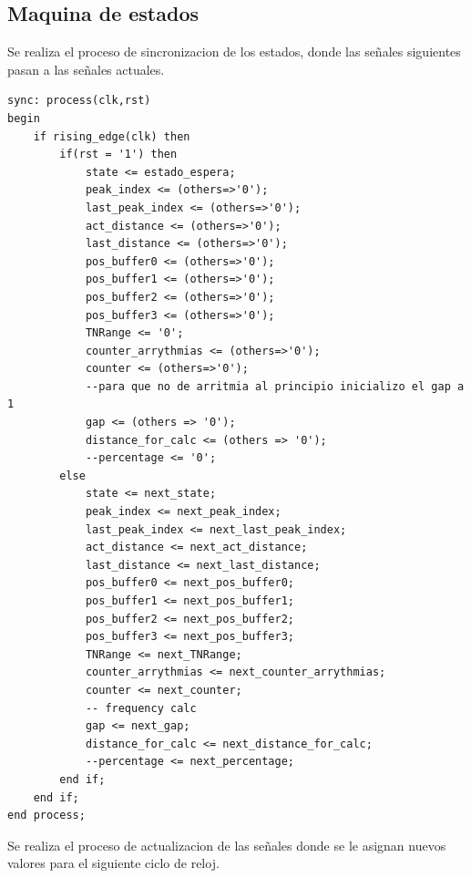 \subsection{Maquina de estados}
Se realiza el proceso de sincronizacion de los estados, donde las señales siguientes pasan a las señales actuales.

\lstset{language=VHDL, breaklines=true, basicstyle=\footnotesize}
\begin{lstlisting}[frame=single]
sync: process(clk,rst)
begin
    if rising_edge(clk) then
        if(rst = '1') then
            state <= estado_espera;
            peak_index <= (others=>'0');
            last_peak_index <= (others=>'0');
            act_distance <= (others=>'0');
            last_distance <= (others=>'0');
            pos_buffer0 <= (others=>'0');
            pos_buffer1 <= (others=>'0');
            pos_buffer2 <= (others=>'0');
            pos_buffer3 <= (others=>'0');
            TNRange <= '0';
            counter_arrythmias <= (others=>'0');
            counter <= (others=>'0');
            --para que no de arritmia al principio inicializo el gap a 1
            gap <= (others => '0');
            distance_for_calc <= (others => '0');
            --percentage <= '0';
        else
            state <= next_state;
            peak_index <= next_peak_index;
            last_peak_index <= next_last_peak_index;
            act_distance <= next_act_distance;
            last_distance <= next_last_distance;
            pos_buffer0 <= next_pos_buffer0;
            pos_buffer1 <= next_pos_buffer1;
            pos_buffer2 <= next_pos_buffer2;
            pos_buffer3 <= next_pos_buffer3;
            TNRange <= next_TNRange;
            counter_arrythmias <= next_counter_arrythmias;
            counter <= next_counter; 
            -- frequency calc
            gap <= next_gap;
            distance_for_calc <= next_distance_for_calc;
            --percentage <= next_percentage;
        end if;
    end if;
end process;
\end{lstlisting}

Se realiza el proceso de actualizacion de las señales donde se le asignan nuevos valores para el siguiente ciclo de reloj.

